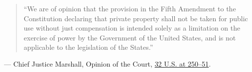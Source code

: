\documentclass[12pt]{article}
\begin{document}
\begin{quote}
``We are of opinion that the provision in the Fifth Amendment to the Constitution declaring that private property shall not be taken for public use without just compensation is intended solely as a limitation on the exercise of power by the Government of the United States, and is not applicable to the legislation of the States.''
\end{quote}
\noindent --- Chief Justice Marshall, Opinion of the Court, \href{https://supreme.justia.com/cases/federal/us/32/243/}{32 U.S. at 250--51}.
\end{document}
